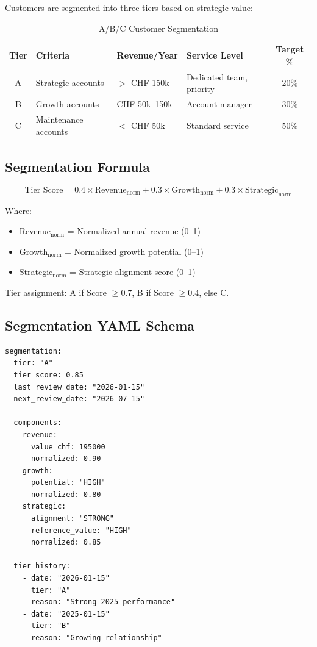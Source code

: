 Customers are segmented into three tiers based on strategic value:

\begin{table}[htbp]
\centering
\caption{A/B/C Customer Segmentation}
\label{tab:bp-segmentation}
\renewcommand{\arraystretch}{1.3}
\begin{tabular}{@{}clllc@{}}
\toprule
\textbf{Tier} & \textbf{Criteria} & \textbf{Revenue/Year} & \textbf{Service Level} & \textbf{Target \%} \\
\midrule
A & Strategic accounts & $>$ CHF 150k & Dedicated team, priority & 20\% \\
B & Growth accounts & CHF 50k--150k & Account manager & 30\% \\
C & Maintenance accounts & $<$ CHF 50k & Standard service & 50\% \\
\bottomrule
\end{tabular}
\end{table}

\subsection{Segmentation Formula}

\begin{equation}
\text{Tier Score} = 0.4 \times \text{Revenue}_{\text{norm}} + 0.3 \times \text{Growth}_{\text{norm}} + 0.3 \times \text{Strategic}_{\text{norm}}
\end{equation}

Where:
\begin{itemize}[nosep]
\item Revenue$_{\text{norm}}$ = Normalized annual revenue (0--1)
\item Growth$_{\text{norm}}$ = Normalized growth potential (0--1)
\item Strategic$_{\text{norm}}$ = Strategic alignment score (0--1)
\end{itemize}

Tier assignment: A if Score $\geq 0.7$, B if Score $\geq 0.4$, else C.

\subsection{Segmentation YAML Schema}

\begin{verbatim}
segmentation:
  tier: "A"
  tier_score: 0.85
  last_review_date: "2026-01-15"
  next_review_date: "2026-07-15"

  components:
    revenue:
      value_chf: 195000
      normalized: 0.90
    growth:
      potential: "HIGH"
      normalized: 0.80
    strategic:
      alignment: "STRONG"
      reference_value: "HIGH"
      normalized: 0.85

  tier_history:
    - date: "2026-01-15"
      tier: "A"
      reason: "Strong 2025 performance"
    - date: "2025-01-15"
      tier: "B"
      reason: "Growing relationship"
\end{verbatim}


